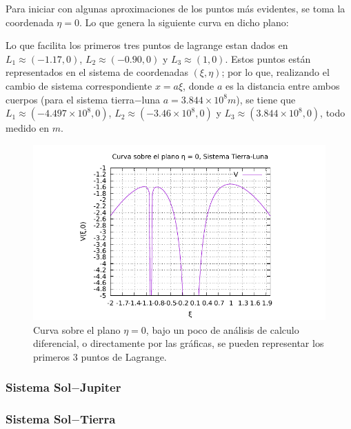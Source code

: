 \begin{multicols}{2}
Para iniciar con algunas aproximaciones de los puntos más evidentes, se toma la coordenada $\eta = 0$. Lo que genera la siguiente curva en dicho plano: 

Lo que facilita los primeros tres puntos de lagrange estan dados en $L_1 \approx (-1.17,0)$, $L_2 \approx (-0.90,0)$ y $L_3 \approx (1,0)$. Estos puntos están representados en el sistema de coordenadas $(\xi ,\eta)$; por lo que, realizando el cambio de sistema correspondiente $x = a\xi$, donde $a$ es la distancia entre ambos cuerpos (para el sistema tierra$-$luna $a = 3.844\times 10^{8} m$), se tiene que $L_1 \approx (-4.497\times 10^{8},0)$, $L_2 \approx (-3.46\times 10^{8},0)$ y $L_3 \approx (3.844\times 10^{8},0)$, todo medido en $m$.
\columnbreak
\begin{figure}[H]
	\centering
	\includegraphics[scale=0.7]{Codigos/planePlotTierraLuna.pdf}
	\caption{Curva sobre el plano $\eta = 0$, bajo un poco de análisis de calculo diferencial, o directamente por las gráficas, se pueden representar los primeros $3$ puntos de Lagrange.}
	\label{fig:planeplot t-l}
\end{figure}
\end{multicols}





\subsubsection{Sistema Sol$-$Jupiter}




\subsubsection{Sistema Sol$-$Tierra}




